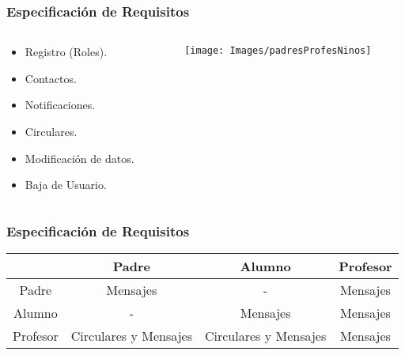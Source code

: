 \begin{frame}
	\frametitle{Especificación de Requisitos}
	\begin{columns}
		\begin{column}{0.6\textwidth}
			\begin{itemize}
				\item Registro (Roles).
				\item Contactos.
				\item Notificaciones.
				\item Circulares.
				\item Modificación de datos.
				\item Baja de Usuario.
			\end{itemize}
			\endblock{}
		\end{column}
		\begin{column}{0.4\textwidth}
			\vfill 
			\begin{center}
				\texttt{[image: Images/padresProfesNinos]}
			\end{center}
		\end{column}
	\end{columns}
\end{frame}


\begin{frame}
	\frametitle{Especificación de Requisitos}
		\begin{table} [!hbt]
			\begin{center}
				\begin{tabular}{|| c | c | c | c ||}
					\hline
					\hline
					& Padre & Alumno & Profesor \\
					\hline
					Padre & Mensajes & - & Mensajes \\
					\hline
					Alumno & - & Mensajes & Mensajes \\
					\hline
					Profesor & Circulares y Mensajes & Circulares y Mensajes & Mensajes \\
					\hline
					\hline
				\end{tabular}
			\end{center}
		\end{table}
	\endblock{}
\end{frame}